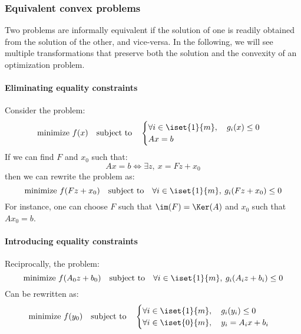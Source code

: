 \subsubsection{Equivalent convex problems}
Two problems are informally equivalent if the solution of one is readily obtained from the solution of the other, and vice-versa. In the following, we will see multiple transformations that preserve both the solution and the convexity of an optimization problem.

\paragraph*{Eliminating equality constraints}
Consider the problem:
\begin{equation*}
    \text{minimize } f(x) \quad\text{subject to}\quad \begin{cases}
        \forall i\in\iset{1}{m}, \quad g_i(x)\leq 0\\
        Ax = b
    \end{cases}
\end{equation*}
If we can find $F$ and $x_0$ such that:
\begin{equation*}
    Ax=b \iff \exists z, \: x=Fz+x_0
\end{equation*}
then we can rewrite the problem as:
\begin{equation*}
    \text{minimize } f(Fz+x_0) \quad\text{subject to}\quad \forall i\in\iset{1}{m}, \: g_i(Fz+x_0)\leq 0
\end{equation*}
For instance, one can choose $F$ such that $\im(F)=\Ker(A)$ and $x_0$ such that $Ax_0=b$.

\paragraph*{Introducing equality constraints}
Reciprocally, the problem:
\begin{equation*}
    \text{minimize } f(A_0z+b_0) \quad\text{subject to}\quad \forall i\in\iset{1}{m}, \: g_i(A_iz+b_i)\leq 0
\end{equation*}
Can be rewritten as:
\begin{equation*}
    \text{minimize } f(y_0) \quad\text{subject to}\quad \begin{cases}
        \forall i\in\iset{1}{m}, \quad g_i(y_i)\leq 0\\
        \forall i\in\iset{0}{m}, \quad y_i=A_ix+b_i
    \end{cases}
\end{equation*}


